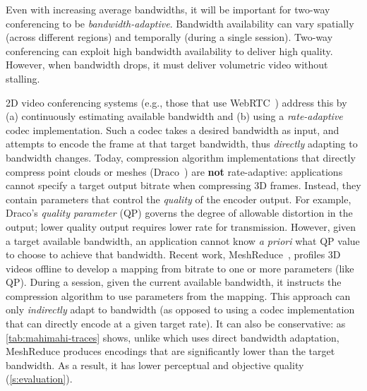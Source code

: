 %
Even with increasing average bandwidths, it will be important for two-way conferencing to be \textit{bandwidth-adaptive}.
%
Bandwidth availability can vary spatially (\ie across different regions) and temporally (\ie during a single session).
%
Two-way conferencing can exploit high bandwidth availability to deliver high quality.
%
However, when bandwidth drops, it must deliver volumetric video without stalling.
%

2D video conferencing systems (e.g., those that use WebRTC~\cite{webrtc}) address this by (a) continuously estimating available bandwidth and (b) using a \textit{rate-adaptive} codec implementation.
%
Such a codec takes a desired bandwidth as input, and attempts to encode the frame at that target bandwidth, thus \textit{directly} adapting to bandwidth changes.
%
Today, compression algorithm implementations that directly compress point clouds or meshes (\eg Draco~\cite{draco}) are \textbf{not} rate-adaptive: applications cannot specify a target output bitrate when compressing 3D frames.
%
Instead, they contain parameters that control the \textit{quality} of the encoder output.
%
For example, Draco's \textit{quality parameter} (QP) governs the degree of allowable distortion in the output; lower quality output requires lower rate for transmission.
%
However, given a target available bandwidth, an application cannot know \textit{a priori} what QP value to choose to achieve that bandwidth.
%
Recent work, MeshReduce~\cite{meshreduce}, profiles 3D videos offline to develop a mapping from bitrate to one or more parameters (like QP).
%
During a session, given the current available bandwidth, it instructs the compression algorithm to use parameters from the mapping.
%
This approach can only \textit{indirectly} adapt to bandwidth (as opposed to using a codec implementation that can directly encode at a given target rate).
%
It can also be conservative: as \cref{tab:mahimahi-traces} shows, unlike \livo{} which uses direct bandwidth adaptation, MeshReduce produces encodings that are significantly lower than the target bandwidth.
%
As a result, it has lower perceptual and objective quality (\cref{s:evaluation}).

